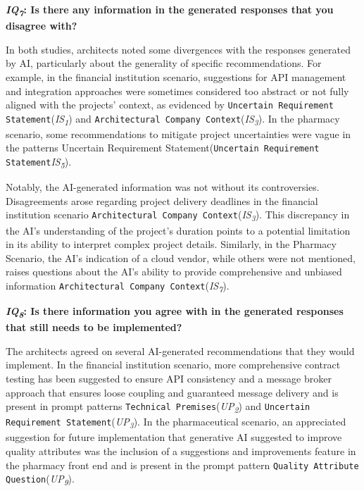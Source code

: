 \textbf{\textit{IQ\textsubscript{7}}: Is there any information in the generated responses that you disagree with?}

In both studies, architects noted some divergences with the responses generated by AI, particularly about the generality of specific recommendations. For example, in the financial institution scenario, suggestions for API management and integration approaches were sometimes considered too abstract or not fully aligned with the projects' context, as evidenced by \texttt{Uncertain Requirement Statement}(\textit{IS\textsubscript{1}}) and  \texttt{Architectural Company Context}(\textit{IS\textsubscript{3}}). In the pharmacy scenario, some recommendations to mitigate project uncertainties were vague in the patterns Uncertain Requirement Statement(\texttt{Uncertain Requirement Statement}\textit{IS\textsubscript{5}}).

Notably, the AI-generated information was not without its controversies. Disagreements arose regarding project delivery deadlines in the financial institution scenario \texttt{Architectural Company Context}(\textit{IS\textsubscript{3}}). This discrepancy in the AI's understanding of the project's duration points to a potential limitation in its ability to interpret complex project details. Similarly, in the Pharmacy Scenario, the AI's indication of a cloud vendor, while others were not mentioned, raises questions about the AI's ability to provide comprehensive and unbiased information \texttt{Architectural Company Context}(\textit{IS\textsubscript{7}}).

\textbf{\textit{IQ\textsubscript{8}}: Is there information you agree with in the generated responses that still needs to be implemented?}

The architects agreed on several AI-generated recommendations that they would implement. In the financial institution scenario, more comprehensive contract testing has been suggested to ensure API consistency and a message broker approach that ensures loose coupling and guaranteed message delivery and is present in prompt patterns \texttt{Technical Premises}(\textit{UP\textsubscript{2}}) and \texttt{Uncertain Requirement Statement}(\textit{UP\textsubscript{3}}). In the pharmaceutical scenario, an appreciated suggestion for future implementation that generative AI suggested to improve quality attributes was the inclusion of a suggestions and improvements feature in the pharmacy front end and is present in the prompt pattern \texttt{Quality Attribute Question}(\textit{UP\textsubscript{9}}).


